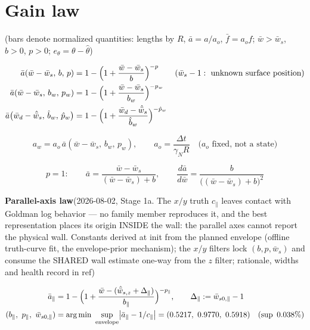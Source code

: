 \documentclass[11pt,a4paper,fontset=none]{ctexart}
\begin{document}
\section{Gain law}

(bars denote normalized quantities: lengths by $R$, $\bar{a} = a/a_o$,
$\bar{f} = a_o f$;
$\bar{w} > \bar{w}_s$, $b > 0$, $p > 0$;
$e_{\theta} = \theta - \hat{\theta}$)

\begin{align*}
\bar{a}(\bar{w}-\bar{w}_s,\, b,\, p)
  &= 1 - \Bigl(1 + \frac{\bar{w}-\bar{w}_s}{b}\Bigr)^{-p}
  \qquad (\bar{w}_s - 1:\ \text{unknown surface position}) \\
\bar{a}(\bar{w}-\bar{w}_s,\, b_w,\, p_w)
  &= 1 - \Bigl(1 + \frac{\bar{w}-\bar{w}_s}{b_w}\Bigr)^{-p_w} \\
\bar{a}\bigl(\bar{w}_d-\hat{\bar{w}}_s,\, \hat{b}_w,\, \hat{p}_w\bigr)
  &= 1 - \Bigl(1 + \frac{\bar{w}_d-\hat{\bar{w}}_s}{\hat{b}_w}\Bigr)^{-\hat{p}_w}
\end{align*}

\begin{equation*}
a_w = a_o\,\bar{a}(\bar{w}-\bar{w}_s,\, b_w,\, p_w),
\qquad a_o = \frac{\Delta t}{\gamma_N R}
\quad \text{($a_o$ fixed, not a state)}
\end{equation*}

\begin{equation*}
p = 1:\qquad
\bar{a} = \frac{\bar{w}-\bar{w}_s}{(\bar{w}-\bar{w}_s) + b},
\qquad
\frac{d\bar{a}}{d\bar{w}} = \frac{b}{\bigl((\bar{w}-\bar{w}_s)+b\bigr)^{2}}
\end{equation*}

\textbf{Parallel-axis law}\quad (2026-08-02, Stage 1a.  The $x/y$ truth
$c_\parallel$ leaves contact with Goldman log behavior --- no family
member reproduces it, and the best representation places its origin
INSIDE the wall: the parallel axes cannot report the physical wall.
Constants derived at init from the planned envelope (offline
truth-curve fit, the envelope-prior mechanism); the $x/y$ filters lock
$(b, p, \bar{w}_s)$ and consume the SHARED wall estimate one-way from
the $z$ filter; rationale, widths and health record in ref)

\begin{align*}
\bar{a}_\parallel
  &= 1 - \Bigl(1 +
    \frac{\bar{w} - (\hat{\bar{w}}_{s,z} + \Delta_\parallel)}
         {b_\parallel}\Bigr)^{-p_\parallel},
\qquad
\Delta_\parallel := \bar{w}_{s0,\parallel} - 1 \\
(b_\parallel,\ p_\parallel,\ \bar{w}_{s0,\parallel})
  &= \arg\min\ \sup_{\text{envelope}}
    \bigl|\bar{a}_\parallel - 1/c_\parallel\bigr|
  = (0.5217,\ 0.9770,\ 0.5918)
\quad (\sup\ 0.038\%)
\end{align*}
\end{document}
